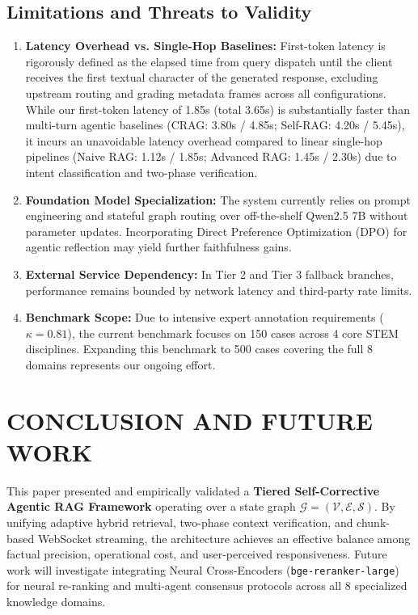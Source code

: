 \documentclass[conference]{IEEEtran}
\begin{document}
\subsection{Limitations and Threats to Validity}
\begin{enumerate}
    \item \textbf{Latency Overhead vs. Single-Hop Baselines:} First-token latency is rigorously defined as the elapsed time from query dispatch until the client receives the first textual character of the generated response, excluding upstream routing and grading metadata frames across all configurations. While our first-token latency of 1.85s (total 3.65s) is substantially faster than multi-turn agentic baselines (CRAG: 3.80s / 4.85s; Self-RAG: 4.20s / 5.45s), it incurs an unavoidable latency overhead compared to linear single-hop pipelines (Naive RAG: 1.12s / 1.85s; Advanced RAG: 1.45s / 2.30s) due to intent classification and two-phase verification.
    \item \textbf{Foundation Model Specialization:} The system currently relies on prompt engineering and stateful graph routing over off-the-shelf Qwen2.5 7B without parameter updates. Incorporating Direct Preference Optimization (DPO) for agentic reflection may yield further faithfulness gains.
    \item \textbf{External Service Dependency:} In Tier 2 and Tier 3 fallback branches, performance remains bounded by network latency and third-party rate limits.
    \item \textbf{Benchmark Scope:} Due to intensive expert annotation requirements ($\kappa = 0.81$), the current benchmark focuses on 150 cases across 4 core STEM disciplines. Expanding this benchmark to 500 cases covering the full 8 domains represents our ongoing effort.
\end{enumerate}

\section{CONCLUSION AND FUTURE WORK}
This paper presented and empirically validated a \textbf{Tiered Self-Corrective Agentic RAG Framework} operating over a state graph $\mathcal{G} = (\mathcal{V}, \mathcal{E}, \mathcal{S})$. By unifying adaptive hybrid retrieval, two-phase context verification, and chunk-based WebSocket streaming, the architecture achieves an effective balance among factual precision, operational cost, and user-perceived responsiveness. Future work will investigate integrating Neural Cross-Encoders (\texttt{bge-reranker-large}) for neural re-ranking and multi-agent consensus protocols across all 8 specialized knowledge domains.



\end{document}
